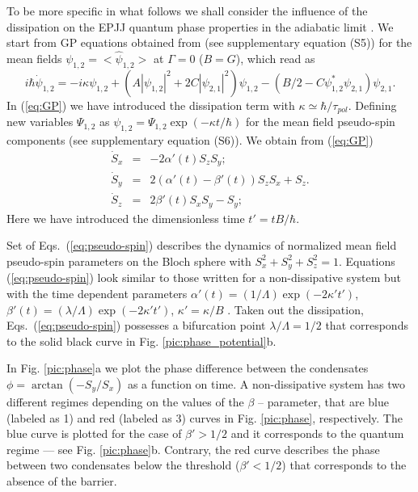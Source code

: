 \documentclass[fleqn,10pt]{wlscirep}
\begin{document}
To be more specific in what follows we shall consider the influence of the dissipation on the EPJJ quantum phase properties in the adiabatic limit \cite{Sols}.
We start from GP equations obtained from  (see supplementary equation (S5)) for the mean fields $\psi_{1,2}=<\hat\psi_{1,2}>$ at $\Gamma = 0$ ($B = G$), which read as
%
\begin{equation}
i \hbar \dot{\psi}_{1,2} = -i \kappa \psi_{1,2} + (A|\psi_{1,2}|^2 + 2C |\psi_{2,1}|^2) \psi_{1,2} - (B/2 - C \psi_{1,2}^* \psi_{2,1}) \psi_{2,1}. 
\label{eq:GP}
\end{equation}
%
In (\ref{eq:GP}) we have introduced the dissipation term with $\kappa \simeq \hbar/\tau_{pol}$.
Defining new variables $\Psi_{1,2}$ as $\psi_{1,2} = \Psi_{1,2} \exp(-\kappa t / \hbar)$ for the mean field pseudo-spin components (see supplementary equation (S6)).
We obtain from (\ref{eq:GP})
% 
\begin{equation}
\begin{array}{lcl}
\dot{S}_x & = & -2 \alpha'(t) S_z S_y; \\
\dot{S}_y & = & 2(\alpha'(t) - \beta'(t)) S_z S_x + S_z. \\
\dot{S}_z & = &  2 \beta'(t) S_x S_y - S_y;
\end{array}
\label{eq:pseudo-spin}
\end{equation}
%
Here we have introduced the dimensionless time $t' = t B / \hbar$.

Set of Eqs.\ ({\ref{eq:pseudo-spin}}) describes the dynamics of normalized mean field pseudo-spin parameters on the Bloch sphere with $S_x^2 + S_y^2 + S_z^2 = 1$.
Equations ({\ref{eq:pseudo-spin}}) look similar to those written for a non-dissipative system but with the time dependent parameters $\alpha'(t) = (1/ \Lambda) \exp(-2 \kappa' t')$, $\beta'(t) = (\lambda / \Lambda) \exp(-2 \kappa' t')$, $\kappa' = \kappa / B$ \cite{Sedov}.
Taken out the dissipation, Eqs.\ ({\ref{eq:pseudo-spin}}) possesses a bifurcation point $\lambda / \Lambda= 1 / 2$ that corresponds to the solid black curve in Fig. \ref{pic:phase_potential}b. 

In Fig. \ref{pic:phase}a we plot the phase difference between the condensates $ \phi = \arctan(-S_y / S_x)$ as a function on time.
A non-dissipative system has two different regimes depending on the values of the $\beta$ -- parameter, that are blue  (labeled as 1) and red (labeled as 3) curves in Fig. \ref{pic:phase}, respectively. The blue curve is plotted for the case of $\beta' > 1/2$ and it corresponds to the quantum regime --- see Fig. \ref{pic:phase}b. Contrary, the red curve describes the phase between two condensates below the threshold ($\beta' <1/2$) that corresponds to the absence of the barrier. 
\end{document}
